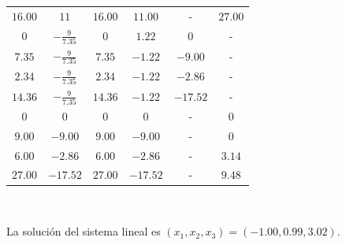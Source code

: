 \documentclass[
	spanish,
	8pt,
	utf8,
	xcolor=table,
	handout,
	aspectratio=169,
	professionalfonts,
	mathserif,
	leqno,
]{beamer}
\begin{document}
\begin{frame}
\begin{minipage}{0.6\textwidth}
\begin{table}[ht!]
\begin{tabular}{|cccccc|}
				$16.00$                                                                                               & $11$                              & $16.00$ & $11.00$  & -        & $27.00$ \\
				$0$                                                                                                   & $-\tfrac{9}{7.35}$                & $0$     & $1.22$   & $0$      & -       \\
				$7.35$                                                                                                & $-\tfrac{9}{7.35}$                & $7.35$  & $-1.22$  & $-9.00$  & -       \\
				$2.34$                                                                                                & $-\tfrac{9}{7.35}$                & $2.34$  & $-1.22$  & $-2.86$  & -       \\
				$14.36$                                                                                               & $-\tfrac{9}{7.35}$                & $14.36$ & $-1.22$  & $-17.52$ & -       \\
				$0$                                                                                                   & $0$                               & $0$     & $0$      & -        & $0$     \\
				$9.00$                                                                                                & $-9.00$                           & $9.00$  & $-9.00$  & -        & $0$     \\
				$6.00$                                                                                                & $-2.86$                           & $6.00$  & $-2.86$  & -        & $3.14$  \\
				$27.00$                                                                                               & $-17.52$                          & $27.00$ & $-17.52$ & -        & $9.48$  \\
				\hline
			\end{tabular}
		\end{table}

		\

		La solución del sistema lineal es
		\begin{math}
			\left(
			x_{1},
			x_{2},
			x_{3}
			\right)=
			\left(
			-1.00,
			0.99,
			3.02
			\right)
		\end{math}.
	\end{minipage}
\end{frame}
\end{document}
